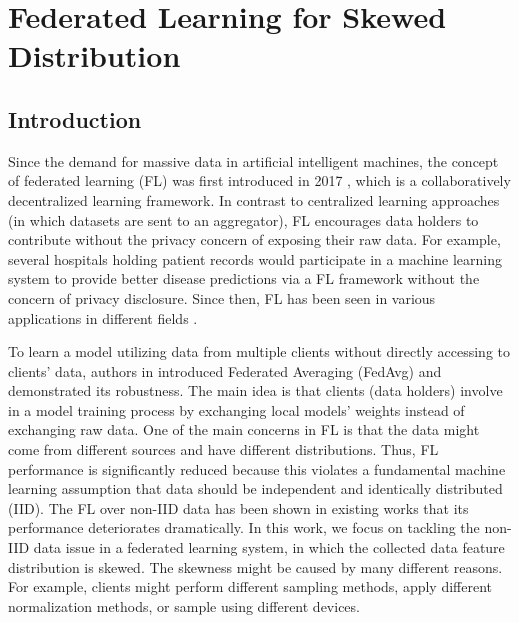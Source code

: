 

\newcommand{\MethodnameLong}{Federated Learning for Skewed Distribution Using Sample Weights}
\newcommand{\MethodnameShort}{FedDisk}

\newcommand{\px}[2]{p_{#1}(\mathbf{x_{#2}})}
\newcommand{\qx}[2]{q_{#1}(\mathbf{x_{#2}})}

\newcommand{\Prob}{\mathcal{P} }


\newcommand{\x}{\mathbf{x}}
\newcommand{\ubold}{\mathbf{u}}

\newcommand\parties{100}



\newcommand{\ChapterPathFedDisk}{Chapter2} 


\chapter{Federated Learning for Skewed Distribution}
\label{chap:FedDisk}




\section{Introduction}
\label{sec:FedIntro}
Since the demand for massive data in artificial intelligent machines, the concept of federated learning (FL) was first introduced in 2017 \cite{OriginFL}, which is a collaboratively decentralized learning framework. In contrast to centralized learning approaches (in which datasets are sent to an aggregator), FL encourages data holders to contribute without the privacy concern of exposing their raw data. For example, several hospitals holding patient records would participate in a machine learning system to provide better disease predictions via a FL framework without the concern of privacy disclosure. Since then, FL has been seen in various applications in different fields \cite{abs-1811-03604,yadav_federated_2022,feki_federated_2021,zhai_dynamic_2021}. 

To learn a model utilizing data from multiple clients without directly accessing to clients' data, authors in \cite{OriginFL} introduced Federated Averaging (FedAvg) and demonstrated its robustness. The main idea is that clients (data holders) involve in a model training process by exchanging local models' weights instead of exchanging raw data. One of the main concerns in FL is that the data might come from different sources and have different distributions. Thus, FL performance is significantly reduced because this violates a fundamental machine learning assumption that data should be independent and identically distributed (IID). The FL over non-IID data has been shown in existing works \cite{ZHU2021371,Sahu2018OnTC,9392310,abs_1905_06641,Shen2020FederatedML,9155494,abs-2102-02079,abs-2005-11418} that its performance deteriorates dramatically. In this work, we focus on tackling the non-IID data issue in a federated learning system, in which the collected data feature distribution is skewed. The skewness might be caused by many different reasons. For example, clients might perform different sampling methods, apply different normalization methods, or sample using different devices. 

